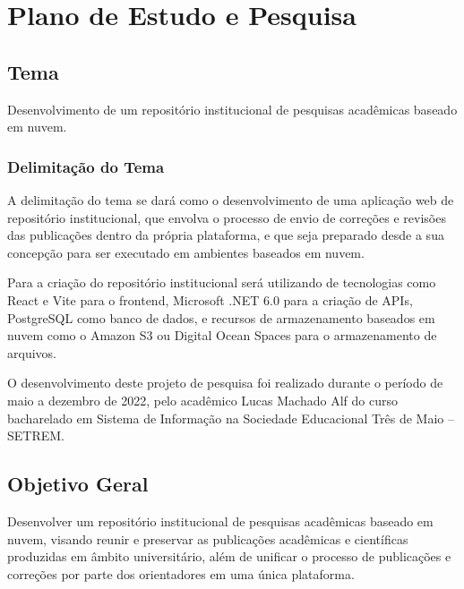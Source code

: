 \chapter{Plano de Estudo e Pesquisa} \label{chap:ResearchPlan}

\section{Tema} \label{sec::Theme}
Desenvolvimento de um repositório institucional de pesquisas acadêmicas
baseado em nuvem.

\subsection{Delimitação do Tema} \label{subsec::ThemeDelimitation}

A delimitação do tema se dará como o desenvolvimento de uma aplicação
web de repositório institucional, que envolva o processo de envio
de correções e revisões das publicações dentro da própria plataforma,
e que seja preparado desde a sua concepção para ser executado em ambientes
baseados em nuvem.

Para a criação do repositório institucional será utilizando de tecnologias
como React e Vite para o frontend, Microsoft .NET 6.0 para a criação
de APIs, PostgreSQL como banco de dados, e recursos de armazenamento baseados em
nuvem como o Amazon S3 ou Digital Ocean Spaces para o armazenamento de arquivos.

O desenvolvimento deste projeto de pesquisa foi realizado durante o período de
maio a dezembro de 2022, pelo acadêmico Lucas Machado Alf do curso bacharelado
em Sistema de Informação na Sociedade Educacional Três de Maio – SETREM.

\section{Objetivo Geral} \label{sec:objective}

Desenvolver um repositório institucional de pesquisas acadêmicas
baseado em nuvem, visando reunir e preservar as publicações acadêmicas 
e científicas produzidas em âmbito universitário, além de unificar o processo
de publicações e correções por parte dos orientadores em uma única plataforma.

